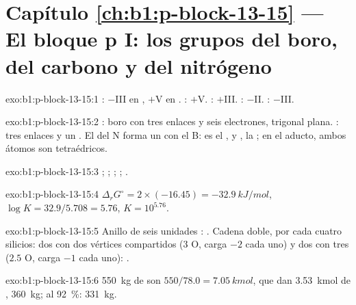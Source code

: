 \section*{Capítulo \ref{ch:b1:p-block-13-15} --- El bloque p I: los grupos del boro, del carbono y del nitrógeno}

\begin{solution}{exo:b1:p-block-13-15:1}
: $-$III en , $+$V en . : $+$V.
: $+$III. : $-$II. : $-$III.
\end{solution}

\begin{solution}{exo:b1:p-block-13-15:2}
: boro con tres enlaces y seis electrones, trigonal plana.
: tres enlaces y un . El  del N
forma un  con el B:  es el , y
, la ; en el aducto, ambos átomos son tetraédricos.
\end{solution}

\begin{solution}{exo:b1:p-block-13-15:3}
; ;
; ;
.
\end{solution}

\begin{solution}{exo:b1:p-block-13-15:4}
$\Delta_r G^\circ = 2 \times (-16.45) = \qty{-32.9}{kJ/mol}$, $\log K =
32.9/5.708 = 5.76$, $K = 10^{5.76}$.
\end{solution}

\begin{solution}{exo:b1:p-block-13-15:5}
Anillo de seis unidades : . Cadena doble, por
cada cuatro silicios: dos con dos vértices compartidos (3 O, carga $-2$
cada uno) y dos con tres ($2.5$ O, carga $-1$ cada uno): .
\end{solution}

\begin{solution}{exo:b1:p-block-13-15:6}
\qty{550}{kg} de  son $550/78.0 = \qty{7.05}{kmol}$, que dan
\qty{3.53}{kmol} de , \qty{360}{kg}; al \qty{92}{\percent}:
\qty{331}{kg}.
\end{solution}

